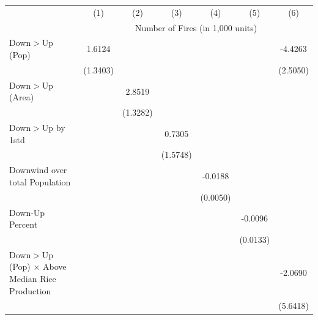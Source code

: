 \begin{tabular}{lcccccc}
\hline
& (1) & (2) & (3) & (4) & (5) & (6)\\
& \multicolumn{6}{c}{Number of Fires (in 1,000 units) }\\
\hline

Down$>$Up (Pop)&      1.6124         &                     &                     &                     &                     &     -4.4263\sym{*}  \\
            &    (1.3403)         &                     &                     &                     &                     &    (2.5050)         \\
Down$>$Up (Area)&                     &      2.8519\sym{**} &                     &                     &                     &                     \\
            &                     &    (1.3282)         &                     &                     &                     &                     \\
Down$>$Up by 1std&                     &                     &      0.7305         &                     &                     &                     \\
            &                     &                     &    (1.5748)         &                     &                     &                     \\
Downwind over total Population&                     &                     &                     &     -0.0188\sym{***}&                     &                     \\
            &                     &                     &                     &    (0.0050)         &                     &                     \\
Down-Up Percent&                     &                     &                     &                     &     -0.0096         &                     \\
            &                     &                     &                     &                     &    (0.0133)         &                     \\
Down$>$Up (Pop) $\times$ Above Median Rice Production&                     &                     &                     &                     &                     &     -2.0690         \\
            &                     &                     &                     &                     &                     &    (5.6418)         \\

\end{tabular}
